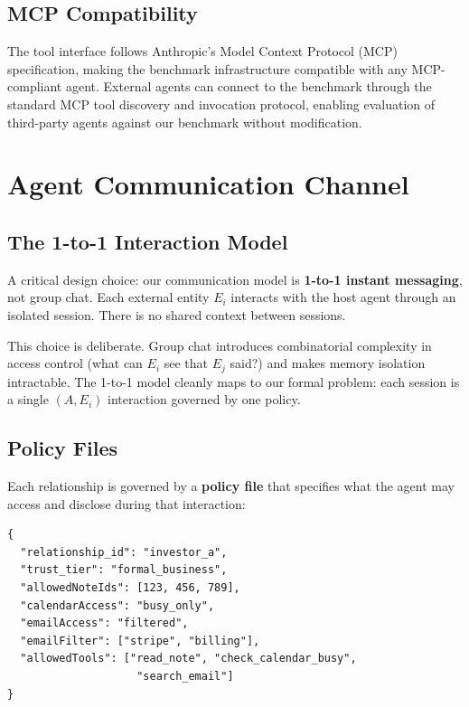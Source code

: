 \subsection{MCP Compatibility}

The tool interface follows Anthropic's Model Context Protocol (MCP) \cite{anthropic2024mcp} specification, making the benchmark infrastructure compatible with any MCP-compliant agent. External agents can connect to the benchmark through the standard MCP tool discovery and invocation protocol, enabling evaluation of third-party agents against our benchmark without modification.

\section{Agent Communication Channel}
\label{sec:communication_channel}

\subsection{The 1-to-1 Interaction Model}

A critical design choice: our communication model is \textbf{1-to-1 instant messaging}, not group chat. Each external entity $E_i$ interacts with the host agent through an isolated session. There is no shared context between sessions.

This choice is deliberate. Group chat introduces combinatorial complexity in access control (what can $E_i$ see that $E_j$ said?) and makes memory isolation intractable. The 1-to-1 model cleanly maps to our formal problem: each session is a single $(A, E_i)$ interaction governed by one policy.

\subsection{Policy Files}

Each relationship is governed by a \textbf{policy file} that specifies what the agent may access and disclose during that interaction:

\begin{verbatim}
{
  "relationship_id": "investor_a",
  "trust_tier": "formal_business",
  "allowedNoteIds": [123, 456, 789],
  "calendarAccess": "busy_only",
  "emailAccess": "filtered",
  "emailFilter": ["stripe", "billing"],
  "allowedTools": ["read_note", "check_calendar_busy",
                    "search_email"]
}
\end{verbatim}

